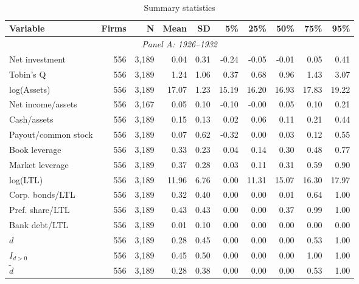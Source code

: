 \begin{table}[p]\centering
    \caption{\\ Summary statistics}
    \scriptsize
    \label{tab:summary_main}
    
    \begin{threeparttable}
        \begin{tabular}{lrrrrrrrrr}
            \toprule
            Variable & Firms & N & Mean & SD & 5\% & 25\% & 50\% & 75\% & 95\% \\
            \midrule
            \multicolumn{10}{c}{\textit{Panel A: 1926--1932}} \\
            \midrule
            Net investment & 556 & 3,189 & 0.04 & 0.31 & -0.24 & -0.05 & -0.01 & 0.05 & 0.41 \\
            Tobin's Q & 556 & 3,189 & 1.24 & 1.06 & 0.37 & 0.68 & 0.96 & 1.43 & 3.07 \\
            log(Assets) & 556 & 3,189 & 17.07 & 1.23 & 15.19 & 16.20 & 16.93 & 17.83 & 19.22 \\
            Net income/assets & 556 & 3,167 & 0.05 & 0.10 & -0.10 & -0.00 & 0.05 & 0.10 & 0.21 \\
            Cash/assets & 556 & 3,189 & 0.15 & 0.13 & 0.02 & 0.06 & 0.11 & 0.21 & 0.44 \\
            Payout/common stock & 556 & 3,189 & 0.07 & 0.62 & -0.32 & 0.00 & 0.03 & 0.12 & 0.55 \\
            Book leverage & 556 & 3,189 & 0.33 & 0.23 & 0.04 & 0.14 & 0.30 & 0.48 & 0.77 \\
            Market leverage & 556 & 3,189 & 0.37 & 0.28 & 0.03 & 0.11 & 0.31 & 0.59 & 0.90 \\
            log(LTL) & 556 & 3,189 & 11.96 & 6.76 & 0.00 & 11.31 & 15.07 & 16.30 & 17.97 \\
            Corp. bonds/LTL & 556 & 3,189 & 0.32 & 0.40 & 0.00 & 0.00 & 0.01 & 0.64 & 1.00 \\
            Pref. share/LTL & 556 & 3,189 & 0.43 & 0.43 & 0.00 & 0.00 & 0.37 & 0.99 & 1.00 \\
            Bank debt/LTL & 556 & 3,189 & 0.01 & 0.10 & 0.00 & 0.00 & 0.00 & 0.00 & 0.00 \\
            \ensuremath{d} & 556 & 3,189 & 0.28 & 0.45 & 0.00 & 0.00 & 0.00 & 0.53 & 1.00 \\
            \ensuremath{I_{d>0}} & 556 & 3,189 & 0.45 & 0.50 & 0.00 & 0.00 & 0.00 & 1.00 & 1.00 \\
            \ensuremath{\tilde{d}} & 556 & 3,189 & 0.28 & 0.38 & 0.00 & 0.00 & 0.00 & 0.53 & 1.00 \\

\end{tabular}
\end{threeparttable}
\end{table}
